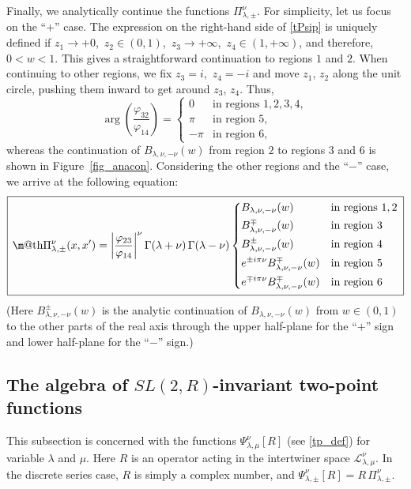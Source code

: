 \documentclass[11pt]{article}
\makeatletter
\newcommand*{\wideboxed}[1]{\setlength{\fboxsep}{1ex}%
  \fbox{\m@th$\displaystyle#1$}}
\newcommand{\lt}{\left}
\newcommand{\rt}{\right}
\newcommand{\vp}{\varphi}
\newcommand{\calL}{\mathcal{L}}
\newcommand{\RR}{\mathbb{R}}
\DeclareMathOperator{\SL}{SL}
\newcommand{\lam}{\lambda}
\def\widetilde#1{#1}%
\def\SL{SL}
\def\RR{R}
\makeatother
\begin{document}
Finally, we analytically continue the functions $\Pi^{\nu}_{\lambda,\pm}$. For simplicity, let us focus on the ``$+$'' case. The expression on the right-hand side of \eqref{tPsip} is uniquely defined if $z_1\to+0$,\, $z_2\in(0,1)$,\, $z_3\to+\infty$,\, $z_4\in(1,+\infty)$, and therefore, $0<w<1$. This gives a straightforward continuation to regions $1$ and $2$. When continuing to other regions, we fix $z_3=i$,\, $z_4=-i$ and move $z_1$, $z_2$ along the unit circle, pushing them inward to get around $z_3$, $z_4$. Thus,
\begin{equation}
\arg\lt(\frac{\vp_{32}}{\vp_{14}}\rt)=\begin{cases}
0 & \text{in regions } 1,2,3,4,\\
\pi & \text{in region } 5,\\
-\pi & \text{in region } 6,
\end{cases}
\end{equation}
whereas the continuation of $B_{\lambda,\nu,-\nu}(w)$ from region $2$ to regions $3$ and $6$ is shown in Figure~\ref{fig_anacon}. Considering the other regions and the ``$-$'' case, we arrive at the following equation:
\begin{equation}\label{tpf-disc}
\wideboxed{
\Pi^{\nu}_{\lambda,\pm}(x,x')
=\left|\frac{\vp_{23}}{\vp_{14}}\right|^{\nu}
\Gamma(\lambda+\nu)\,\Gamma(\lambda-\nu)
\begin{dcases}
B_{\lam, \nu, -\nu}(w) & \text{in regions } 1, 2\\
B^{\mp}_{\lam, \nu, -\nu}(w) & \text{in region } 3\\
B^{\pm}_{\lam, \nu, -\nu}(w) & \text{in region } 4\\
e^{\pm i \pi \nu}B^{\mp}_{\lam, \nu, -\nu}(w) & \text{in region } 5\\
e^{\mp i \pi \nu}B^{\mp}_{\lam, \nu, -\nu}(w) & \text{in region } 6
\end{dcases}
}
\end{equation}
(Here $B^{\pm}_{\lam,\nu,-\nu}(w)$ is the analytic continuation of $B_{\lam,\nu,-\nu}(w)$ from $w\in(0,1)$ to the other parts of the real axis through the upper half-plane for the ``$+$'' sign and lower half-plane for the ``$-$'' sign.)

\subsection{The algebra of $\widetilde{\SL}(2,\RR)$-invariant two-point functions}\label{app:opalg}

This subsection is concerned with the functions $\Psi^{\nu}_{\lambda,\mu}[R]$ (see \eqref{tp_def}) for variable $\lambda$ and $\mu$. Here $R$ is an operator acting in the intertwiner space $\calL^{\nu}_{\lambda,\mu}$. In the discrete series case, $R$ is simply a complex number, and $\Psi^{\nu}_{\lambda,\pm}[R]=R\,\Pi^{\nu}_{\lambda,\pm}$.
\end{document}
